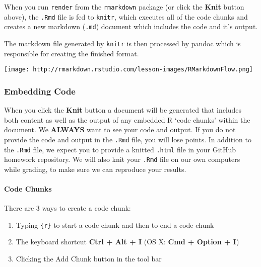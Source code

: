 \documentclass[
]{article}
\providecommand{\tightlist}{%
  \setlength{\itemsep}{0pt}\setlength{\parskip}{0pt}}
\begin{document}
When you run \texttt{render} from the \texttt{rmarkdown} package (or
click the \textbf{Knit} button above), the \texttt{.Rmd} file is fed to
\texttt{knitr}, which executes all of the code chunks and creates a new
markdown (\texttt{.md}) document which includes the code and it's
output.

The markdown file generated by \texttt{knitr} is then processed by
pandoc which is responsible for creating the finished format.

\texttt{[image: http://rmarkdown.rstudio.com/lesson-images/RMarkdownFlow.png]}

\hypertarget{embedding-code}{%
\subsubsection{Embedding Code}\label{embedding-code}}

When you click the \textbf{Knit} button a document will be generated
that includes both content as well as the output of any embedded R `code
chunks' within the document. We \textbf{ALWAYS} want to see your code
and output. If you do not provide the code and output in the
\texttt{.Rmd} file, you will lose points. In addition to the
\texttt{.Rmd} file, we expect you to provide a knitted \texttt{.html}
file in your GitHub homework repository. We will also knit your
\texttt{.Rmd} file on our own computers while grading, to make sure we
can reproduce your results.

\hypertarget{code-chunks}{%
\paragraph{Code Chunks}\label{code-chunks}}

There are 3 ways to create a code chunk:

\begin{enumerate}
\def\labelenumi{\arabic{enumi}.}
\tightlist
\item
  Typing
  \texttt{\textasciigrave{}\textasciigrave{}\textasciigrave{}\{r\}} to
  start a code chunk and then
  \texttt{\textasciigrave{}\textasciigrave{}\textasciigrave{}} to end a
  code chunk\\
\item
  The keyboard shortcut \textbf{Ctrl + Alt + I} (OS X: \textbf{Cmd +
  Option + I})\\
\item
  Clicking the Add Chunk button in the tool bar
\end{enumerate}
\end{document}
